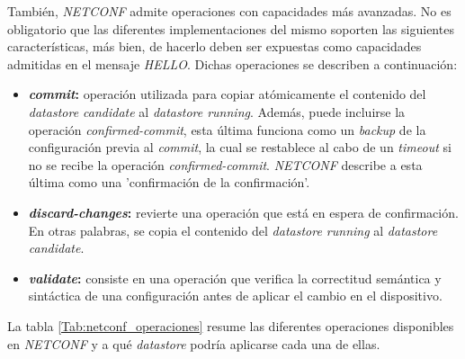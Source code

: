 También, \textit{NETCONF} admite operaciones con capacidades más avanzadas. No es obligatorio que las diferentes implementaciones del mismo soporten las siguientes características, más bien, de hacerlo deben ser expuestas como capacidades admitidas en el mensaje \textit{HELLO}. Dichas operaciones se describen a continuación:
\begin{itemize}
	\item \textbf{\textit{commit}:} operación utilizada para copiar atómicamente el contenido del \textit{datastore candidate} al \textit{datastore running}. Además, puede incluirse la operación \textit{confirmed-commit}, esta última funciona como un \textit{backup} de la configuración previa al \textit{commit}, la cual se restablece al cabo de un \textit{timeout} si no se recibe la operación \textit{confirmed-commit}. \textit{NETCONF} describe a esta última como una 'confirmación de la confirmación'.
	\item \textbf{\textit{discard-changes}:} revierte una operación que está en espera de confirmación. En otras palabras, se copia el contenido del \textit{datastore running} al \textit{datastore candidate}.
	\item \textbf{\textit{validate}:} consiste en una operación que verifica la correctitud semántica y sintáctica de una configuración antes de aplicar el cambio en el dispositivo. 
\end{itemize}


La tabla \ref{Tab:netconf_operaciones} resume las diferentes operaciones disponibles en \textit{NETCONF} y a qué \textit{datastore} podría aplicarse cada una de ellas. 
\\


